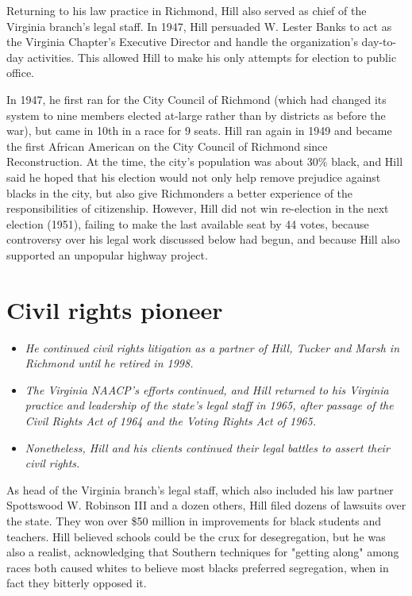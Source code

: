 Returning to his law practice in Richmond, Hill also served as chief of
the Virginia branch's legal staff. In 1947, Hill persuaded W. Lester
Banks to act as the Virginia Chapter's Executive Director and handle the
organization's day-to-day activities. This allowed Hill to make his only
attempts for election to public office.

In 1947, he first ran for the City Council of Richmond (which had
changed its system to nine members elected at-large rather than by
districts as before the war), but came in 10th in a race for 9 seats.
Hill ran again in 1949 and became the first African American on the City
Council of Richmond since Reconstruction. At the time, the city's
population was about 30\% black, and Hill said he hoped that his
election would not only help remove prejudice against blacks in the
city, but also give Richmonders a better experience of the
responsibilities of citizenship. However, Hill did not win re-election
in the next election (1951), failing to make the last available seat by
44 votes, because controversy over his legal work discussed below had
begun, and because Hill also supported an unpopular highway project.

\section{Civil rights pioneer}\label{civil-rights-pioneer}

\begin{itemize}
\item
  \emph{He continued civil rights litigation as a partner of Hill,
  Tucker and Marsh in Richmond until he retired in 1998.}
\item
  \emph{The Virginia NAACP's efforts continued, and Hill returned to his
  Virginia practice and leadership of the state's legal staff in 1965,
  after passage of the Civil Rights Act of 1964 and the Voting Rights
  Act of 1965.}
\item
  \emph{Nonetheless, Hill and his clients continued their legal battles
  to assert their civil rights.}
\end{itemize}

As head of the Virginia branch's legal staff, which also included his
law partner Spottswood W. Robinson III and a dozen others, Hill filed
dozens of lawsuits over the state. They won over \$50 million in
improvements for black students and teachers. Hill believed schools
could be the crux for desegregation, but he was also a realist,
acknowledging that Southern techniques for "getting along" among races
both caused whites to believe most blacks preferred segregation, when in
fact they bitterly opposed it.

